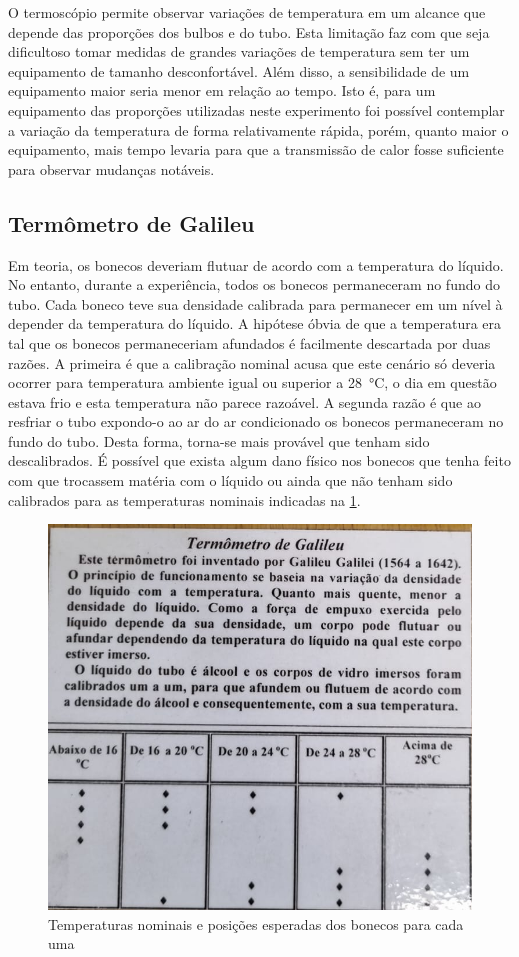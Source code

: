 O termoscópio permite observar variações de temperatura em um alcance que depende das proporções dos bulbos e do tubo. Esta limitação faz com que seja dificultoso tomar medidas de grandes variações de temperatura sem ter um equipamento de tamanho desconfortável. Além disso, a sensibilidade de um equipamento maior seria menor em relação ao tempo. Isto é, para um equipamento das proporções utilizadas neste experimento foi possível contemplar a variação da temperatura de forma relativamente rápida, porém, quanto maior o equipamento, mais tempo levaria para que a transmissão de calor fosse suficiente para observar mudanças notáveis. 

\subsection{Termômetro de Galileu}

Em teoria, os bonecos deveriam flutuar de acordo com a temperatura do líquido. No entanto, durante a experiência, todos os bonecos permaneceram no fundo do tubo. Cada boneco teve sua densidade calibrada para permanecer em um nível à depender da temperatura do líquido. A hipótese óbvia de que a temperatura era tal que os bonecos permaneceriam afundados é facilmente descartada por duas razões. A primeira é que a calibração nominal acusa que este cenário só deveria ocorrer para temperatura ambiente igual ou superior a \qty{28}{\celsius}, o dia em questão estava frio e esta temperatura não parece razoável. A segunda razão é que ao resfriar o tubo expondo-o ao ar do ar condicionado os bonecos permaneceram no fundo do tubo. Desta forma, torna-se mais provável que tenham sido descalibrados. É possível que exista algum dano físico nos bonecos que tenha feito com que trocassem matéria com o líquido ou ainda que não tenham sido calibrados para as temperaturas nominais indicadas na \cref{temps}.

\begin{figure}[h]
    \centering
    \includegraphics[width=.5\linewidth]{fig/temps}
    \caption{Temperaturas nominais e posições esperadas dos bonecos para cada uma}\label{temps}
\end{figure}

